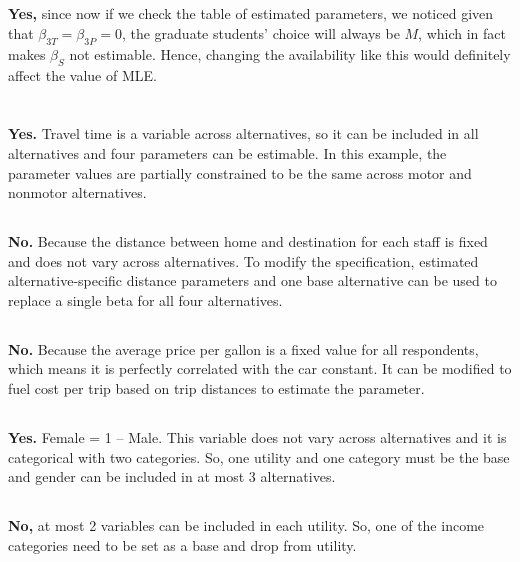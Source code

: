 \documentclass[11pt]{article}
\begin{document}
\subsection{}
\textbf{Yes,} since now if we check the table of estimated parameters, we noticed given	that $\beta_{3T}=\beta_{3P}=0$, the graduate students' choice will always be $M$, which in fact makes $\beta_S$ not estimable. Hence, changing the availability like this would definitely affect the value of MLE.
\section{}
\subsection{}
\textbf{Yes.} Travel time is a variable across alternatives, so it can be included in all alternatives and four parameters can be estimable. In this example, the parameter values are partially constrained to be the same across motor and nonmotor alternatives.
\subsection{} 
\textbf{No.} Because the distance between home and destination for each staff is fixed and does not vary across alternatives. To modify the specification, estimated alternative-specific distance parameters and one base alternative can be used to replace a single beta for all four alternatives.
\subsection{} 
\textbf{No.} Because the average price per gallon is a fixed value for all respondents, which means it is perfectly correlated with the car constant. It can be modified to fuel cost per trip based on trip distances to estimate the parameter.
\subsection{} 
\textbf{Yes.} Female = 1 – Male. This variable does not vary across alternatives and it is categorical with two categories. So, one utility and one category must be the base and gender can be included in at most 3 alternatives. 
\subsection{} 
\textbf{No,} at most 2 variables can be included in each utility. So, one of the income categories need to be set as a base and drop from utility.
\end{document}

